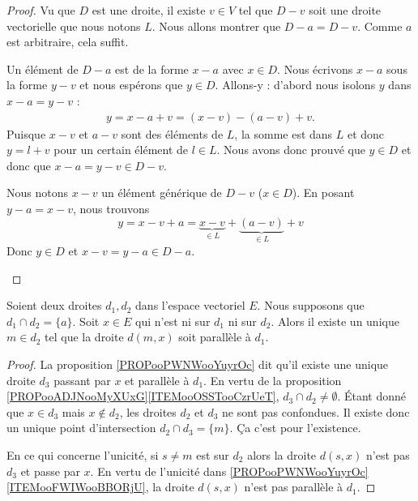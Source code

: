 \begin{proof}
	Vu que \( D\) est une droite, il existe \( v\in V\) tel que \( D-v\) soit une droite vectorielle que nous notons \( L\). Nous allons montrer que \( D-a=D-v\). Comme \( a\) est arbitraire, cela suffit.

	\begin{subproof}
		\spitem[\( D-a\subset D-v\)]
		Un élément de \( D-a\) est de la forme \( x-a\) avec \( x\in D\). Nous écrivons \( x-a\) sous la forme \( y-v\) et nous espérons que \( y\in D\). Allons-y : d'abord nous isolons \( y\) dans \( x-a=y-v\) :
		\begin{subequations}
			\begin{align}
				y=x-a+v=(x-v)-(a-v)+v.
			\end{align}
		\end{subequations}
		Puisque \( x-v\) et \( a-v\) sont des éléments de \( L\), la somme est dans \( L\) et donc \( y=l+v\) pour un certain élément de \( l\in L\). Nous avons donc prouvé que \( y\in D\) et donc que \( x-a=y-v\in D-v\).

		\spitem[\( D-v\subset D-a\)]
		Nous notons \( x-v\) un élément générique de \( D-v\) (\( x\in D\)). En posant \( y-a=x-v\), nous trouvons
		\begin{equation}
			y=x-v+a=\underbrace{x-v}_{\in L}+\underbrace{(a-v)}_{\in L}+v
		\end{equation}
		Donc \( y\in D\) et \( x-v=y-a\in D-a\).
	\end{subproof}
\end{proof}

\begin{proposition}	\label{PROPooOKGGooEXvWVm}
	Soient deux droites \( d_1,d_2\) dans l'espace vectoriel \( E\). Nous supposons que \( d_1\cap d_2=\{ a \}\). Soit \( x\in E\) qui n'est ni sur \( d_1\) ni sur \( d_2\). Alors il existe un unique \( m\in d_2\) tel que la droite \( d(m,x)\) soit parallèle à \( d_1\).
\end{proposition}

\begin{proof}
	La proposition \ref{PROPooPWNWooYuyrOc} dit qu'il existe une unique droite \( d_3\) passant par \( x\) et parallèle à \( d_1\). En vertu de la proposition \ref{PROPooADJNooMyXUxG}\ref{ITEMooOSSTooCzrUeT}, \( d_3\cap d_2\neq \emptyset\). Étant donné que \( x\in d_3\) mais \( x\not\in d_2\), les droites \( d_2\) et \( d_3\) ne sont pas confondues. Il existe donc un unique point d'intersection \( d_2\cap d_3=\{ m \}\). Ça c'est pour l'existence.

	En ce qui concerne l'unicité, si \( s\neq m\) est sur \( d_2\) alors la droite \( d(s,x)\) n'est pas \( d_3\) et passe par \( x\). En vertu de l'unicité dans \ref{PROPooPWNWooYuyrOc}\ref{ITEMooFWIWooBBORjU}, la droite \( d(s,x)\) n'est pas parallèle à \( d_1\).
\end{proof}


